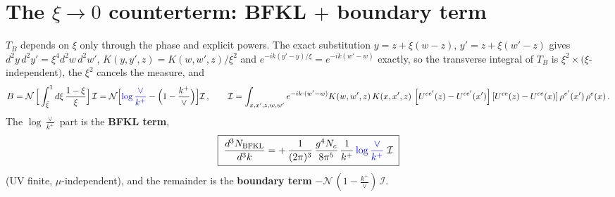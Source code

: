 \documentclass[9pt]{article}
\newcommand{\Wzz}{\left[U^{ce'}(z) - U^{ce'}(x')\right]\left[U^{ce}(z) - U^{ce}(x)\right]\rho^{e'}(x')\,\rho^{e}(x)}
\begin{document}
\section{The $\xi\to0$ counterterm: BFKL $+$ boundary term}
$T_{B}$ depends on $\xi$ only through the phase and explicit powers. The exact substitution
$y=z+\xi(w-z)$, $y'=z+\xi(w'-z)$ gives $d^{2}y\,d^{2}y'=\xi^{4}d^{2}w\,d^{2}w'$,
$K(y,y',z)=K(w,w',z)/\xi^{2}$ and $e^{-ik(y'-y)/\xi}=e^{-ik(w'-w)}$ exactly, so the transverse
integral of $T_{B}$ is $\xi^{2}\times(\xi$-independent$)$, the $\xi^{2}$ cancels the measure,
and
\begin{align}
B=\mathcal N\,\Big[\int_{\bar\xi}^{1}d\xi\,\frac{1-\xi}{\xi}\Big]\,\mathcal I
=\mathcal N\Big[{\color{blue}\log\frac{\vee}{k^{+}}}-\Big(1-\frac{k^{+}}{\vee}\Big)\Big]\mathcal I\,,
\qquad
\mathcal I=\int_{x,x',z,w,w'}e^{-ik\cdot(w'-w)}K(w,w',z)\,K(x,x',z)\,\Wzz\,.
\end{align}
The $\log\frac{\vee}{k^{+}}$ part is the \textbf{BFKL term},
\begin{align}\label{eq:bfkl}
\boxed{\;\frac{d^{3}N_{\rm BFKL}}{d^{3}k}
=+\,\frac{1}{(2\pi)^{3}}\,\frac{g^{4}N_{c}}{8\pi^{5}}\,\frac{1}{k^{+}}\,{\color{blue}\log\frac{\vee}{k^{+}}}\;\mathcal I\;}
\end{align}
(UV finite, $\mu$-independent), and the remainder is the \textbf{boundary term}
$-\mathcal N\,(1-\frac{k^{+}}{\vee})\,\mathcal I$.
\end{document}
